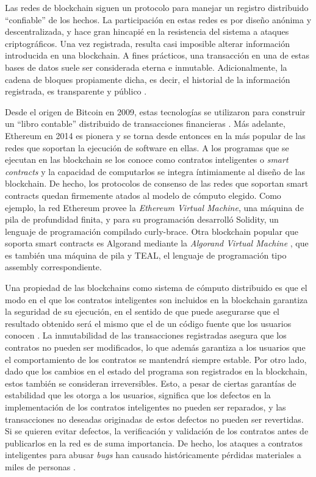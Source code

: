 Las redes de blockchain siguen un protocolo para manejar un registro distribuido ``confiable'' de los hechos.
La participación en estas redes es por diseño anónima y descentralizada, y hace gran hincapié en la resistencia del sistema a ataques criptográficos.
Una vez registrada, resulta casi imposible  alterar información introducida en una blockchain.
A fines prácticos, una transacción en una de estas bases de datos suele ser considerada eterna e inmutable.
Adicionalmente, la cadena de bloques propiamente dicha, es decir, el historial de la información registrada, es transparente y público \cite{bitcoin-overview} \cite{survey-of-blockchain-security}.

Desde el origen de Bitcoin en 2009, estas tecnologías se utilizaron para construir un ``libro contable'' distribuido  de transacciones financieras \cite{survey-of-blockchain-security}.
Más adelante, Ethereum en 2014 \cite{ethereum-white-paper} es pionera y se torna desde entonces en la más popular de las redes que soportan la ejecución de software en ellas.
A los programas que se ejecutan en las blockchain se los conoce como contratos inteligentes o \textit{smart contracts} y la capacidad de computarlos se integra íntimiamente al diseño de las blockchain.
De hecho, los protocolos de consenso de las redes que soportan smart contracts quedan firmemente atados al modelo de cómputo elegido.
Como ejemplo, la red Ethereum provee la \emph{Ethereum Virtual Machine}\cite{ethereum-yellow-paper}, una máquina de pila de profundidad finita, y para su programación desarrolló Solidity\cite{solidity}, un lenguaje de programación compilado curly-brace.
Otra blockchain popular que soporta smart contracts es Algorand mediante la \textit{Algorand Virtual Machine} \cite{algorand-avm}, que es también una máquina de pila y TEAL, el lenguaje de programación tipo assembly correspondiente.

Una propiedad de las blockchains como sistema de cómputo distribuido es que el modo en el que los contratos inteligentes son incluidos en la blockchain garantiza la seguridad de su ejecución, en el sentido de que puede asegurarse que el resultado obtenido será el mismo que el de un código fuente que los usuarios conocen \cite{survey-of-blockchain-security}.
La inmutabilidad de las transacciones registradas asegura que los contratos no pueden ser modificados, lo que además garantiza a los usuarios que el comportamiento de los contratos se mantendrá siempre estable.
Por otro lado, dado que los cambios en el estado del programa son registrados en la blockchain, estos también se consideran irreversibles.
Esto, a pesar de ciertas garantías de estabilidad que les otorga a los usuarios, significa que los defectos en la implementación de los contratos inteligentes no pueden ser reparados, y las transacciones no deseadas originadas de estos defectos no pueden ser revertidas.
Si se quieren evitar defectos, la verificación y validación de los contratos antes de publicarlos en la red es de suma importancia.
De hecho, los ataques a contratos inteligentes para abusar \textit{bugs} han causado históricamente pérdidas materiales a miles de personas \cite{DAO}.

